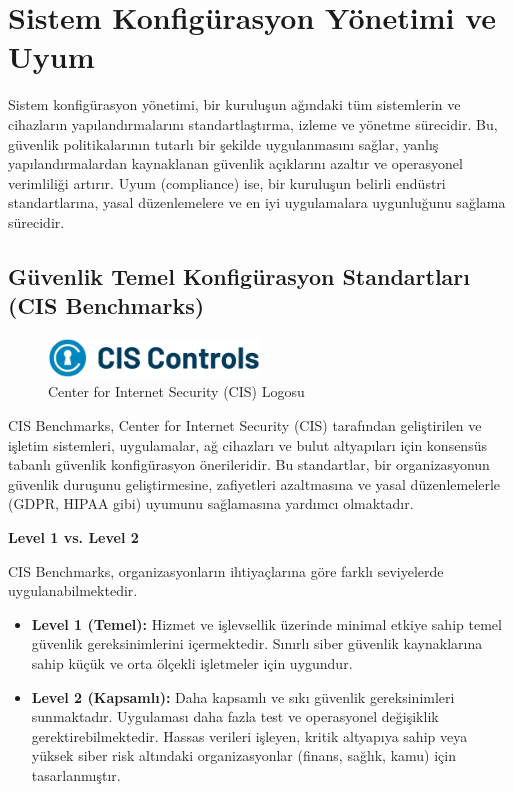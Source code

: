 \section{Sistem Konfigürasyon Yönetimi ve Uyum}

Sistem konfigürasyon yönetimi, bir kuruluşun ağındaki tüm sistemlerin ve cihazların yapılandırmalarını standartlaştırma, izleme ve yönetme sürecidir. Bu, güvenlik politikalarının tutarlı bir şekilde uygulanmasını sağlar, yanlış yapılandırmalardan kaynaklanan güvenlik açıklarını azaltır ve operasyonel verimliliği artırır. Uyum (compliance) ise, bir kuruluşun belirli endüstri standartlarına, yasal düzenlemelere ve en iyi uygulamalara uygunluğunu sağlama sürecidir.

\subsection{Güvenlik Temel Konfigürasyon Standartları (CIS Benchmarks)}

\begin{figure}[H]
    \centering
    \includegraphics[width=0.5\textwidth]{img/logo_cis.png}
    \caption{Center for Internet Security (CIS) Logosu}
    \label{fig:cis-logo}
\end{figure}

CIS Benchmarks, Center for Internet Security (CIS) tarafından geliştirilen ve işletim sistemleri, uygulamalar, ağ cihazları ve bulut altyapıları için konsensüs tabanlı güvenlik konfigürasyon önerileridir. Bu standartlar, bir organizasyonun güvenlik duruşunu geliştirmesine, zafiyetleri azaltmasına ve yasal düzenlemelerle (GDPR, HIPAA gibi) uyumunu sağlamasına yardımcı olmaktadır.

\textbf{Level 1 vs. Level 2}

CIS Benchmarks, organizasyonların ihtiyaçlarına göre farklı seviyelerde uygulanabilmektedir.

\begin{itemize}
    \item \textbf{Level 1 (Temel):} Hizmet ve işlevsellik üzerinde minimal etkiye sahip temel güvenlik gereksinimlerini içermektedir. Sınırlı siber güvenlik kaynaklarına sahip küçük ve orta ölçekli işletmeler için uygundur.
    \item \textbf{Level 2 (Kapsamlı):} Daha kapsamlı ve sıkı güvenlik gereksinimleri sunmaktadır. Uygulaması daha fazla test ve operasyonel değişiklik gerektirebilmektedir. Hassas verileri işleyen, kritik altyapıya sahip veya yüksek siber risk altındaki organizasyonlar (finans, sağlık, kamu) için tasarlanmıştır.
\end{itemize}

